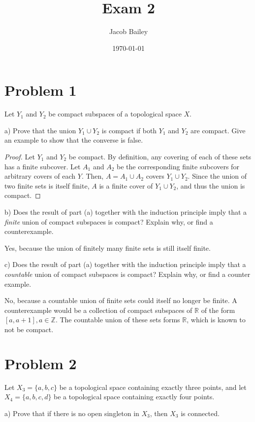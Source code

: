 \documentclass[11pt]{article}
\author{Jacob Bailey}
\date{\today}
\title{Exam 2}
\begin{document}
\maketitle
\section{Problem 1}
\label{sec:org28fe9cb}
Let \(Y_1\) and \(Y_2\) be compact subspaces of a topological space \(X\). 

a) Prove that the union \(Y_1\cup Y_2\) is compact if both \(Y_1\) and \(Y_2\) are
compact. Give an example to show that the converse is false. 

\begin{proof}
Let \(Y_1\) and \(Y_2\) be compact. By definition, any covering of each of these
sets has a finite subcover. Let \(A_1\) and \(A_2\) be the corresponding finite
subcovers for arbitrary covers of each \(Y\). Then, \(A = A_1\cup A_2\) covers
\(Y_1\cup Y_2\). Since the union of two finite sets is itself finite, \(A\) is a
finite cover of \(Y_1\cup Y_2\), and thus the union is compact. 
\end{proof}

b) Does the result of part (a) together with the induction principle imply that
a \textit{finite} union of compact subspaces is compact? Explain why, or find a
counterexample. 

Yes, because the union of finitely many finite sets is still itself finite. 

c) Does the result of part (a) together with the induction principle imply that
a \textit{countable} union of compact subspaces is compact? Explain why, or find
a counter example. 

No, because a countable union of finite sets could itself no longer be finite. A
counterexample would be a collection of compact subspaces of \(\mathbb{R}\) of the
form \([a, a+1], a\in\mathbb{Z}\). The countable union of these sets forms
\(\mathbb{R}\), which is known to not be compact.  

\section{Problem 2}
\label{sec:org21f7b82}
Let \(X_3 = \{a, b, c\}\) be a topological space containing exactly three points,
and let \(X_4 = \{a, b, c, d\}\) be a topological space containing exactly four
points. 

a) Prove that if there is no open singleton in \(X_3\), then \(X_3\) is connected.
\end{document}
